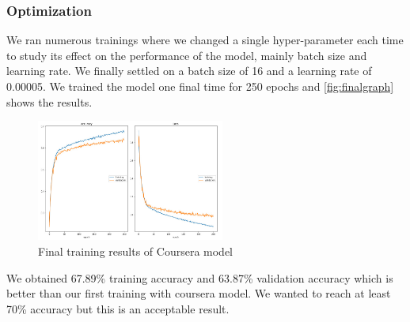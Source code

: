 \documentclass[12pt,a4paper,oneside,english]{book}
\begin{document}
\subsubsection{Optimization}
We ran numerous trainings where we changed a single hyper-parameter each time to study its effect on the performance of the model, mainly batch size and learning rate.
We finally settled on a batch size of 16 and a learning rate of 0.00005. We  trained the model one final time for 250 epochs and \autoref{fig:finalgraph} shows the results.
\begin{figure}[H]
    \centering
    \includegraphics[width=0.55\textwidth]{figures/model/finalgraph.jpg}
    \caption{Final training results of Coursera model}
    \label{fig:finalgraph}
\end{figure}
\noindent
We obtained 67.89\% training accuracy and 63.87\% validation accuracy which is better than our first training with coursera model. We wanted to reach at least 70\% accuracy but this is an acceptable result.
\end{document}

